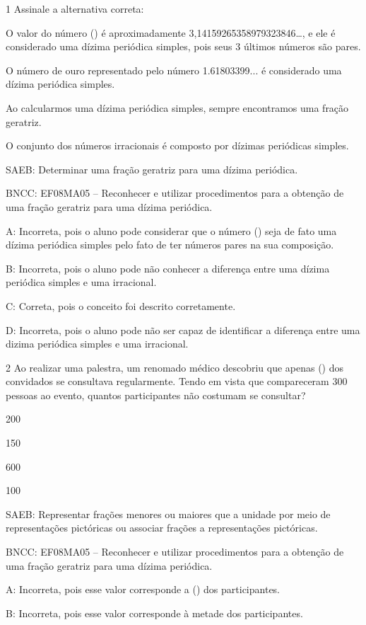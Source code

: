 \num{1} Assinale a alternativa correta:
\item O valor do número (\pi) é aproximadamente
3,14159265358979323846\ldots, e ele é considerado uma dízima periódica
simples, pois seus 3 últimos números são pares.
\item O número de ouro representado pelo número 1.61803399... é considerado
uma dízima periódica simples.
\item Ao calcularmos uma dízima periódica simples, sempre encontramos uma
fração geratriz.
\item O conjunto dos números irracionais é composto por dízimas periódicas
simples.

SAEB: Determinar uma fração geratriz para uma dízima periódica.

BNCC: EF08MA05 -- Reconhecer e utilizar procedimentos para a obtenção de
uma fração geratriz para uma dízima periódica.

A: Incorreta, pois o aluno pode considerar que o número (\pi) seja de
fato uma dízima periódica simples pelo fato de ter números pares na sua
composição.

B: Incorreta, pois o aluno pode não conhecer a diferença entre uma
dízima periódica simples e uma irracional.

C: Correta, pois o conceito foi descrito corretamente.

D: Incorreta, pois o aluno pode não ser capaz de identificar a diferença
entre uma dizima periódica simples e uma irracional.

\num{2} Ao realizar uma palestra, um renomado médico descobriu que apenas
() dos convidados se consultava regularmente. Tendo em
vista que compareceram 300 pessoas ao evento, quantos participantes não
costumam se consultar?
\item 200
\item 150
\item 600
\item 100

SAEB: Representar frações menores ou maiores que a unidade por meio de
representações pictóricas ou associar frações a representações
pictóricas.

BNCC: EF08MA05 -- Reconhecer e utilizar procedimentos para a obtenção de
uma fração geratriz para uma dízima periódica.

A: Incorreta, pois esse valor corresponde a () dos
participantes.

B: Incorreta, pois esse valor corresponde à metade dos participantes.

